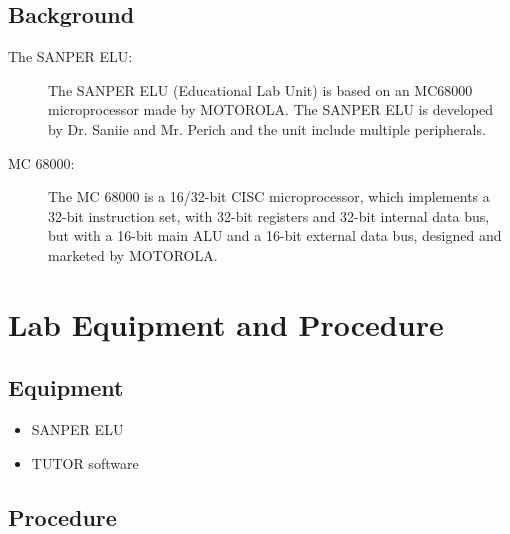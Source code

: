 \documentclass{article}
\begin{document}
\subsection{Background}
\label{background}
\begin{description}
\item[The SANPER ELU:]
The SANPER ELU (Educational Lab Unit) is based on an MC68000 microprocessor made by MOTOROLA\textregistered. The SANPER ELU is developed by Dr. Saniie and Mr. Perich and the unit include multiple peripherals.
\item[MC 68000:]
The MC 68000 is a 16/32-bit CISC microprocessor, which implements a 32-bit instruction set, with 32-bit registers and 32-bit internal data bus, but with a 16-bit main ALU and a 16-bit external data bus, designed and marketed by MOTOROLA\textregistered.
\end{description} 
 

\section{Lab Equipment and Procedure}
\subsection{Equipment}
\begin{itemize}
\item SANPER ELU
\item TUTOR software
\end{itemize}
\subsection{Procedure}
\end{document}
